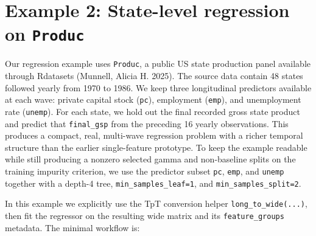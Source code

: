 \documentclass[
  letterpaper,
  DIV=11,
  numbers=noendperiod]{scrartcl}
\begin{document}
\section{\texorpdfstring{Example 2: State-level regression on
\texttt{Produc}}{Example 2: State-level regression on Produc}}\label{example-2-state-level-regression-on-produc}

Our regression example uses \texttt{Produc}, a public US state
production panel available through Rdatasets (Munnell, Alicia H. 2025).
The source data contain 48 states followed yearly from 1970 to 1986. We
keep three longitudinal predictors available at each wave: private
capital stock (\texttt{pc}), employment (\texttt{emp}), and unemployment
rate (\texttt{unemp}). For each state, we hold out the final recorded
gross state product and predict that \texttt{final\_gsp} from the
preceding 16 yearly observations. This produces a compact, real,
multi-wave regression problem with a richer temporal structure than the
earlier single-feature prototype. To keep the example readable while
still producing a nonzero selected gamma and non-baseline splits on the
training impurity criterion, we use the predictor subset \texttt{pc},
\texttt{emp}, and \texttt{unemp} together with a depth-4 tree,
\texttt{min\_samples\_leaf=1}, and \texttt{min\_samples\_split=2}.

In this example we explicitly use the TpT conversion helper
\texttt{long\_to\_wide(...)}, then fit the regressor on the resulting
wide matrix and its \texttt{feature\_groups} metadata. The minimal
workflow is:
\end{document}
